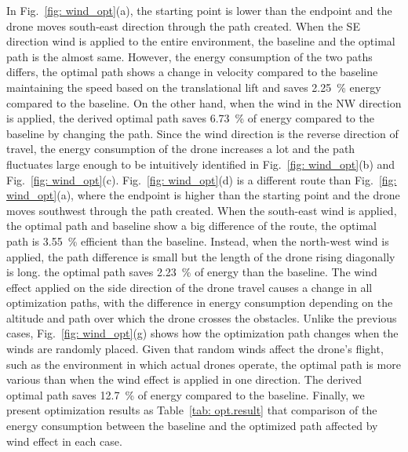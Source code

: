 \documentclass[journal]{./template/IEEEtran}
\begin{document}
In Fig.~\ref{fig: wind_opt}(a), the starting point is lower than the endpoint and the drone moves south-east direction through the path created. 
When the SE direction wind is applied to the entire environment, the baseline and the optimal path is the almost same.
However, the energy consumption of the two paths differs, the optimal path shows a change in velocity compared to the baseline maintaining the speed based on the translational lift and saves 2.25~\% energy compared to the baseline.
On the other hand, when the wind in the NW direction is applied, the derived optimal path saves 6.73~\% of energy compared to the baseline by changing the path.
Since the wind direction is the reverse direction of travel, the energy consumption of the drone increases a lot and the path fluctuates large enough to be intuitively identified in Fig.~\ref{fig: wind_opt}(b) and Fig.~\ref{fig: wind_opt}(c).  
Fig.~\ref{fig: wind_opt}(d) is a different route than Fig.~\ref{fig: wind_opt}(a), where the endpoint is higher than the starting point and the drone moves southwest through the path created. When the south-east wind is applied, the optimal path and baseline show a big difference of the route, the optimal path is 3.55~\% efficient than the baseline.
Instead, when the north-west wind is applied, the path difference is small but the length of the drone rising diagonally is long. the optimal path saves 2.23~\% of energy than the baseline.
The wind effect applied on the side direction of the drone travel causes a change in all optimization paths, with the difference in energy consumption depending on the altitude and path over which the drone crosses the obstacles.
Unlike the previous cases, Fig.~\ref{fig: wind_opt}(g) shows how the optimization path changes when the winds are randomly placed.
Given that random winds affect the drone's flight, such as the environment in which actual drones operate, the optimal path is more various than when the wind effect is applied in one direction.
The derived optimal path saves 12.7~\% of energy compared to the baseline. 
Finally, we present optimization results as Table~\ref{tab: opt.result} that comparison of the energy consumption between the baseline and the optimized path affected by wind effect in each case.
\end{document}
